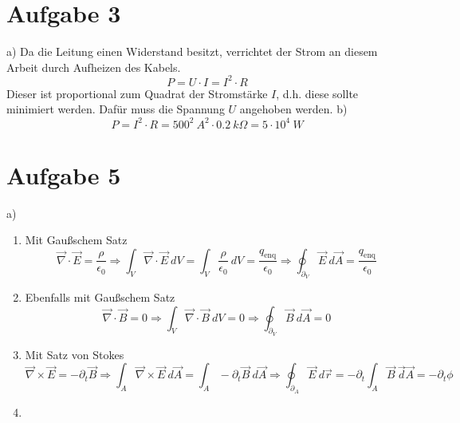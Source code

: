 \documentclass[11pt a4paper]{article}
\newcommand{\delt}{\partial_t}
\newcommand{\epsz}{\epsilon_0}
\newcommand{\diver}{\vec \nabla \cdot}
\newcommand{\rot}{\vec \nabla \times}
\begin{document}
\newpage

\section*{Aufgabe 3}
a) Da die Leitung einen Widerstand besitzt, verrichtet der Strom an diesem Arbeit durch Aufheizen des Kabels.
\[ P = U \cdot I = I^2 \cdot R \]
Dieser ist proportional zum Quadrat der Stromstärke $I$, d.h. diese sollte minimiert werden. Dafür muss die 
Spannung $U$ angehoben werden.
b)
\[
	P = I^2 \cdot R = 500^2 \ A^2 \cdot 0.2 \ k\Omega = 5 \cdot 10^4 \ W
\]

\newpage

\section*{Aufgabe 5}
a) 
\begin{enumerate}
	\item Mit Gaußschem Satz
	\[ 
		\diver \vec E = \frac{\rho}{\epsz} 
		\Rightarrow
		\int_V \diver \vec E \ dV = \int_V \frac{\rho}{\epsz} \ dV = \frac{q_\text{enq}}{\epsz}
		\Rightarrow
		\oint_{\partial_V} \vec E \ d\vec A = \frac{q_\text{enq}}{\epsz}
	\]
	\item Ebenfalls mit Gaußschem Satz
	\[
		\diver \vec B = 0
		\Rightarrow
		\int_V \diver \vec B \ dV = 0
		\Rightarrow
		\oint_{\partial_V} \vec B \ d\vec A = 0
	\]
	\item Mit Satz von Stokes
	\[
		\rot \vec E = -\delt \vec B
		\Rightarrow
		\int_A \rot \vec E \ d\vec A = \int_A -\delt \vec B \ d\vec A
		\Rightarrow
		\oint_{\partial_A} \vec E \ d\vec r = -\delt \int_A \vec B \ \vec d\vec A = -\delt \phi
	\]
	\item 
\end{enumerate}
\end{document}
